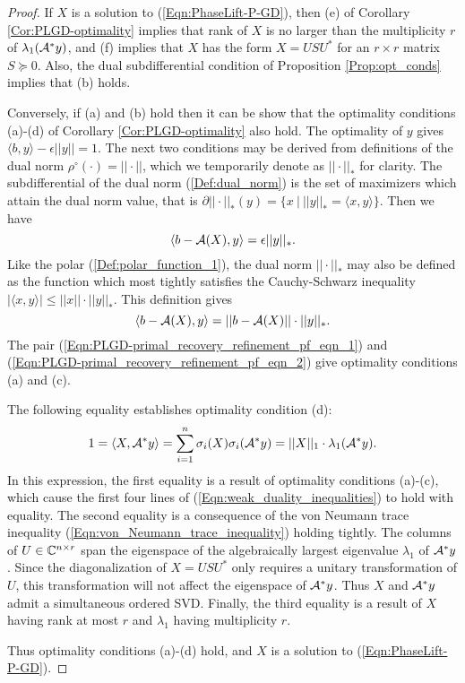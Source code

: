 \begin{proof}
If $X$ is a solution to (\ref{Eqn:PhaseLift-P-GD}), then (e) of Corollary \ref{Cor:PLGD-optimality} implies that rank of $X$ is no larger than the multiplicity $r$ of $\lambda_1({\mathcal A}^*y)$, and (f) implies that $X$ has the form $X = USU^*$ for an $r \times r$ matrix $S \succeq 0$.  Also, the dual subdifferential condition of Proposition \ref{Prop:opt_conds} implies that (b) holds.

Conversely, if (a) and (b) hold then it can be show that the optimality conditions (a)-(d) of Corollary \ref{Cor:PLGD-optimality} also hold.  The optimality of $y$ gives $\langle b, y \rangle - \epsilon ||y|| = 1$.  The next two conditions may be derived from definitions of the dual norm $\rho^\circ(\cdot) = ||\cdot||$, which we temporarily denote as $||\cdot||_*$ for clarity. The subdifferential of the dual norm (\ref{Def:dual_norm}) is the set of maximizers which attain the dual norm value, that is $\partial || \cdot ||_* (y) = \{ x \ | \ ||y||_* = \langle x,y \rangle \}$.  Then we have
\begin{equation}			\label{Eqn:PLGD-primal_recovery_refinement_pf_eqn_1}
\langle b - {\mathcal A}(X), y \rangle = \epsilon ||y||_*.
\end{equation}
Like the polar (\ref{Def:polar_function_1}), the dual norm $||\cdot||_*$ may also be defined as the function which most tightly satisfies the Cauchy-Schwarz inequality $|\langle x, y \rangle| \leq ||x|| \cdot ||y||_*$.  This definition gives
\begin{equation}			\label{Eqn:PLGD-primal_recovery_refinement_pf_eqn_2}
\langle b - {\mathcal A}(X), y \rangle = ||b-{\mathcal A}(X)|| \cdot ||y||_*.
\end{equation} 
The pair (\ref{Eqn:PLGD-primal_recovery_refinement_pf_eqn_1}) and (\ref{Eqn:PLGD-primal_recovery_refinement_pf_eqn_2}) give optimality conditions (a) and (c).

The following equality establishes optimality condition (d):
\[
1 = \langle X, {\mathcal A}^*y \rangle = \sum_{i=1}^n \sigma_i(X) \sigma_i({\mathcal A}^*y) = ||X||_1 \cdot \lambda_1({\mathcal A}^*y).
\]
In this expression, the first equality is a result of optimality conditions (a)-(c), which cause the first four lines of (\ref{Eqn:weak_duality_inequalities}) to hold with equality.  The second equality is a consequence of the von Neumann trace inequality (\ref{Eqn:von_Neumann_trace_inequality}) holding tightly.  The columns of $U \in {\mathbb C}^{n \times r}$ span the eigenspace of the algebraically largest eigenvalue $\lambda_1$ of ${\mathcal A}^*y$.  Since the diagonalization of $X = USU^*$ only requires a unitary transformation of $U$, this transformation will not affect the eigenspace of ${\mathcal A}^*y$.  Thus $X$ and ${\mathcal A}^*y$ admit a simultaneous ordered SVD.  Finally, the third equality is a result of $X$ having rank at most $r$ and $\lambda_1$ having multiplicity $r$.

Thus optimality conditions (a)-(d) hold, and  $X$ is a solution to (\ref{Eqn:PhaseLift-P-GD}).


\end{proof}

